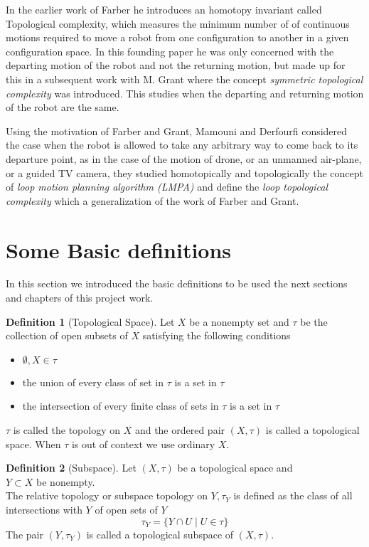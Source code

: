 \documentclass[a4paper, 12pt]{scrartcl}
\theoremstyle{definition}
\newtheorem{defn}{Definition}[thm]
\begin{document}
    In the earlier work of Farber he introduces an homotopy invariant called Topological complexity, which measures the minimum number of of continuous motions required to move a robot from one configuration to another in a given configuration space. In this founding paper he was only concerned with the departing motion of the robot and not the returning motion, but made up for this in a subsequent work with M. Grant where the concept \textit{symmetric topological complexity} was introduced. This studies when the departing and returning motion of the robot are the same.

    Using the motivation of Farber and Grant, Mamouni and Derfourfi considered the case when the robot is allowed to take any arbitrary way to come back to its departure point, as in the case of the motion of drone, or an unmanned air-plane, or a guided TV camera, they studied homotopically and topologically the concept of \textit{loop motion planning algorithm (LMPA)}  and define the \textit{loop topological complexity} which a generalization of the work of Farber and Grant. 

    \section{Some Basic definitions}
    In this section we introduced the basic definitions to be used the next sections and chapters of this project work.

    \begin{defn}[Topological Space]
        Let $X$ be a nonempty set and $\tau$ be the collection of open subsets of $X$ satisfying the following conditions
        \begin{itemize}
            \item[1.] $\emptyset, X \in \tau$
            \item[2.] the union of every class of set in $\tau$ is a set in $\tau$
            \item[3.] the intersection of every finite class of sets in $\tau$ is a set in $\tau$
        \end{itemize}
        $\tau$ is called the topology on $X$ and the ordered pair $(X, \tau)$ is called a topological space. When $\tau$ is out of context we use ordinary $X$.
    \end{defn}

    \begin{defn}[Subspace]
        Let $(X, \tau)$ be a topological space and\\
         $Y \subset X$ be nonempty.\\
        The relative topology or subspace topology on $Y, \tau_Y$ is defined as the class of all intersections with $Y$ of open sets of $Y$
        \[
            \tau_Y = \{Y \cap U  \mid U \in \tau\}
        \]
        The pair $(Y, \tau_Y)$ is called a topological subspace of $(X, \tau)$.
    \end{defn}
\end{document}
